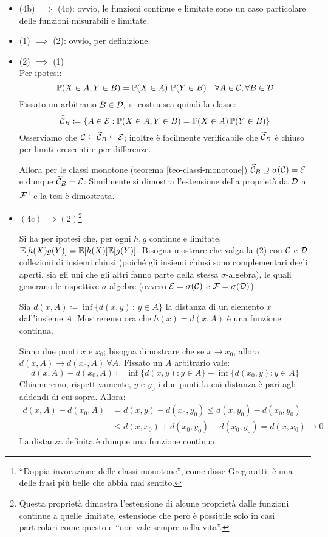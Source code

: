\begin{dimo}
\begin{itemize}
    \item (4b) $\implies$ (4c): ovvio, le funzioni continue e limitate sono un caso particolare delle funzioni misurabili e limitate.

    \item (1) $\implies$ (2): ovvio, per definizione.

    \item (2) $\implies$ (1)\\
      Per ipotesi:
      $$\mathbb P(X \in A, Y \in B)=\mathbb P(X \in A) \ \mathbb P(Y \in B) \quad \forall A \in \mathcal C, \forall B \in \mathcal D$$
      Fissato un arbitrario $B \in \mathcal D, $ si costruisca quindi la classe:
      $$\widetilde{\mathcal C}_B \coloneqq \{ A \in \mathcal E: \mathbb P(X \in A, Y \in B) =\mathbb P(X \in A) \, \mathbb P(Y \in B) \}$$
      Osserviamo che $\mathcal C \subseteq \widetilde{\mathcal C}_B \subseteq \mathcal E$; inoltre è facilmente verificabile che $\widetilde{\mathcal C}_B$ è chiuso per limiti crescenti e per differenze.

      Allora per le classi monotone (teorema \ref{teo-classi-monotone}) $\widetilde{\mathcal C}_B \supseteq \sigma(\mathcal C)=\mathcal E$ e dunque $\widetilde{\mathcal C}_B = \mathcal E$. Similmente si dimostra l'estensione della proprietà da $\mathcal D$ a $\mathcal F$\footnote{``Doppia invocazione delle classi monotone'', come disse Gregoratti; è una delle frasi più belle che abbia mai sentito.}
      e la tesi è dimostrata.
    \item $(4c) \implies (2)$\footnote{Questa proprietà dimostra l'estensione di alcune proprietà dalle funzioni continue a quelle limitate, estensione che però è possibile solo in casi particolari come questo e ``non vale sempre nella vita''.}

      Si ha per ipotesi che, per ogni $h,g$ continue e limitate, $\mathbb E[h(X)g(Y)]=\mathbb E[h(X)]\mathbb E[g(Y)]$. Bisogna mostrare che valga la (2) con $\mathcal C$ e $\mathcal D$ collezioni di insiemi chiusi (poiché gli insiemi chiusi sono complementari degli aperti, sia gli uni che gli altri fanno parte della stessa $\sigma$-algebra), le quali generano le rispettive $\sigma$-algebre (ovvero $\mathcal E = \sigma(\mathcal C)$ e $\mathcal F = \sigma(\mathcal D)$).

      Sia $d(x,A)  \coloneq \inf\{d(x,y) \, : \, y \in A  \} $ la distanza di un elemento $x$ dall'insieme $A$. Mostreremo ora che $h(x)=d(x,A)$ è una funzione continua.

      Siano due punti $x$ e $x_0$; bisogna dimostrare che se $x \to x_0$, allora $d(x,A) \to d(x_0,A) \ \forall A$. Fissato un $A$ arbitrario vale:
      $$d(x,A)-d(x_0,A) \coloneqq \inf\{ d(x,y) : y \in A \} - \inf\{ d(x_0,y) : y \in A \}$$
      Chiameremo, rispettivamente, $y$ e $y_0$ i due punti la cui distanza è pari agli addendi di cui sopra. Allora:
      \begin{align*}
        d(x,A)-d(x_0,A) &= d(x,y)-d(x_0,y_0) \leq d(x,y_0)-d(x_0,y_0) \\
        &\leq d(x,x_0)+d(x_0,y_0)-d(x_0,y_0) = d(x,x_0) \to 0
      \end{align*}
      La distanza definita è dunque una funzione continua.


\end{itemize}
\end{dimo}

